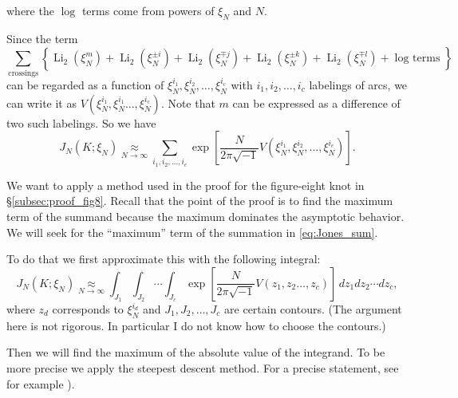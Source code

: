 \documentclass{amsart}
\newcommand{\Li}{\operatorname{Li}}
\theoremstyle{definition}
\theoremstyle{remark}
\numberwithin{equation}{section}
\begin{document}
where the $\log$ terms come from powers of $\xi_N$ and $N$.
\par
Since the term
\begin{equation}\label{eq:dilog}
  \sum_{\text{crossings}}
  \left\{
    \Li_2(\xi^m_N)
    +
    \Li_2(\xi^{\pm i}_N)
    +
    \Li_2(\xi^{\mp j}_N)
    +
    \Li_2(\xi^{\pm k}_N)
    +
    \Li_2(\xi^{\mp l}_N)
    +
    \text{$\log$ terms}
  \right\}
\end{equation}
can be regarded as a function of $\xi_N^{i_1},\xi_N^{i_2},\dots,\xi_N^{i_c}$ with $i_1,i_2,\dots,i_c$ labelings of arcs, we can write it as $V(\xi_N^{i_1},\xi_N^{i_1}\dots,\xi_N^{i_c})$.
Note that $m$ can be expressed as a difference of two such labelings.
So we have
\begin{equation}\label{eq:Jones_sum}
  J_N(K;\xi_N)
  \underset{N\to\infty}{\approx}
  \sum_{i_1,i_2,\dots,i_c}
  \exp
  \left[
    \frac{N}{2\pi\sqrt{-1}}
    V(\xi_N^{i_1},\xi_N^{i_2},\dots,\xi_N^{i_c})
  \right].
\end{equation}
\par
We want to apply a method used in the proof for the figure-eight knot in \S\ref{subsec:proof_fig8}.
Recall that the point of the proof is to find the maximum term of the summand because the maximum dominates the asymptotic behavior.
We will seek for the ``maximum'' term of the summation in \eqref{eq:Jones_sum}.
\par
To do that we first approximate this with the following integral:
\begin{equation}\label{eq:Jones_integral2}
  J_N(K;\xi_N)
  \underset{N\to\infty}{\approx}
  \int_{J_1}\int_{J_2}\cdots\int_{J_c}
  \exp
  \left[
    \frac{N}{2\pi\sqrt{-1}}
    V(z_1,z_2\dots,z_c)
  \right]\,dz_1dz_2\cdots dz_c,
\end{equation}
where $z_d$ corresponds to $\xi_N^{i_d}$ and $J_1,J_2,\dots,J_c$ are certain contours.
(The argument here is not rigorous.
In particular I do not know how to choose the contours.)
\par
Then we will find the maximum of the absolute value of the integrand.
To be more precise we apply the steepest descent method.
For a precise statement, see for example \cite[Theorem~7.2.9]{Marsden/Hoffman:Complex_Analysis}).
\end{document}

